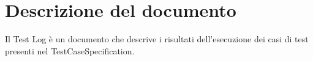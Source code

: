 \chapter{Descrizione del documento}
Il Test Log è un documento che descrive i risultati dell'esecuzione dei casi di test presenti nel TestCaseSpecification.\\